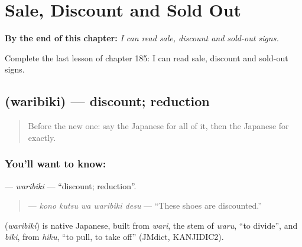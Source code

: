 
\chapter{Sale, Discount and Sold Out}
\label{ch:ja-sale-discount-and-sold-out}

\begin{chapteropening}
\textbf{By the end of this chapter:} \emph{I can read sale, discount and sold-out signs.}

Complete the last lesson of chapter 185: I can read sale, discount and sold-out signs.
\end{chapteropening}

\section[\texorpdfstring{\ja{わりびき} (waribiki)}{わりびき (waribiki)}]{ (waribiki) — discount; reduction}

\label{lesson:JA-C185-waribiki}



\begin{quote}
Before the new one: say the Japanese for all of it, then the Japanese for exactly.
\end{quote}

\subsection*{You'll want to know: }
\textbf{} — \emph{waribiki} — \textquotedblleft{}discount; reduction\textquotedblright{}.

\begin{quote}
\textbf{  } — \emph{kono kutsu wa waribiki desu} — \textquotedblleft{}These shoes are discounted.\textquotedblright{}
\end{quote}

\begin{cousinweb}
\textbf{} (\emph{waribiki}) is native Japanese, built from \emph{wari}, the stem of \emph{waru}, \textquotedblleft{}to divide\textquotedblright{}, and \emph{biki}, from \emph{hiku}, \textquotedblleft{}to pull, to take off\textquotedblright{} (JMdict, KANJIDIC2).
\end{cousinweb}

